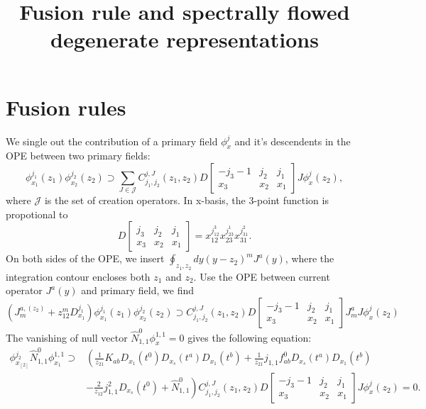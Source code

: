 \documentclass[10pt,a4paper]{article}
\numberwithin{equation}{section}
\begin{document}
\title{Fusion rule and spectrally flowed degenerate representations}
\maketitle
\tableofcontents

\section{Fusion rules}
We single out the contribution of a primary field $\phi^{j}_{x}$ and it's descendents in the OPE between two primary fields:
\begin{equation}
    \phi^{j_{1}}_{x_{1}} (z_{1}) \phi^{j_{2}}_{x_{2}} (z_{2}) \supset \sum_{J \in \mathcal{J}} C^{j,J}_{j_{1},j_{2}}(z_{1},z_{2}) D \left[\begin{array}{ccc}
-j_3 -1 & j_2 & j_1 \\
x_3 & x_2 & x_1
\end{array} \right] J \phi^{j}_{x}(z_{2}),
\end{equation}
where $\mathcal{J}$ is the set of creation operators. In x-basis, the 3-point function is propotional to 
\begin{equation}
    D \left[\begin{array}{ccc}
j_3  & j_2 & j_1 \\
x_3 & x_2 & x_1
\end{array} \right] = x_{12}^{j_{12}^{3}} x_{23}^{j_{23}^{1}} x_{31}^{j_{31}^{2}}.
\end{equation}
On both sides of the OPE, we insert 
$\oint_{z_{1},z_{2}} dy \left(y-z_{2}\right)^{m} J^{a}(y)$, where the integration contour encloses both $z_{1}$ and $z_{2}$. Use the OPE
between current operator $J^{a}(y)$ and primary field, we find 
\begin{equation}
    \left( J^{a,(z_{2})}_{m} + z_{12}^{m} D^{j_{1}}_{x_{1}} \right) \phi^{j_{1}}_{x_{1}} (z_{1}) \phi^{j_{2}}_{x_{2}} (z_{2}) 
    \supset C^{j,J}_{j_{1},j_{2}}(z_{1},z_{2}) D \left[\begin{array}{ccc}
-j_3 -1 & j_2 & j_1 \\
x_3 & x_2 & x_1
\end{array} \right] J^{a}_{m} J \phi^{j}_{x}(z_{2})
\end{equation}
The vanishing of null vector $\hat{N}^{0}_{1,1} \phi^{1,1}_{x} = 0$ gives the following equation:
\begin{equation}
    \begin{aligned}
        \phi^{j_{2}}_{x_[2]} \hat{N}^{0}_{1,1} \phi^{1,1}_{x_{1}} \supset & \left( \frac{1}{z_{21}} K_{a b} D_{x_1}\left(t^0\right) D_{x_s}\left(t^a\right) D_{x_1}\left(t^b\right)+ \frac{1}{z_{21}}j_{1,1} f_{a b}^0 D_{x_s}\left(t^a\right) D_{x_1}\left(t^b\right) \right.\\
    & \left.- \frac{2}{z_{12}} j_{1,1}^2 D_{x_s}\left(t^0\right) + \hat{N}^{0}_{1,1} \right) C^{j,J}_{j_{1},j_{2}}(z_{1},z_{2})
    D \left[\begin{array}{ccc}
    -j_3 -1 & j_2 & j_1 \\
    x_3 & x_2 & x_1
    \end{array} \right] J \phi^{j}_{x}(z_{2})
    = 0.
    \end{aligned}
\end{equation}
\end{document}
